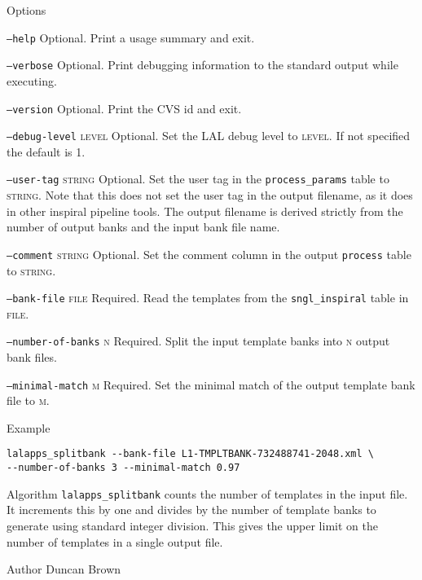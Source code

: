 \begin{entry}
\item[Options]\leavevmode
\begin{entry}
\item[\texttt{--help}] Optional. Print a usage summary and exit.

\item[\texttt{--verbose}] Optional. Print debugging information to the
standard output while executing.

\item[\texttt{--version}] Optional.  Print the CVS id and exit.

\item[\texttt{--debug-level} \textsc{level}] Optional. Set the LAL debug
level to \textsc{level}. If not specified the default is 1.

\item[\texttt{--user-tag} \textsc{string}] Optional. Set the user tag in
the \texttt{process\_params} table to \textsc{string}. Note that this does
not set the user tag in the output filename, as it does in other inspiral
pipeline tools. The output filename is derived strictly from the number of
output banks and the input bank file name.

\item[\texttt{--comment} \textsc{string}] Optional. Set the comment column in
the output \texttt{process} table to \textsc{string}.

\item[\texttt{--bank-file} \textsc{file}] Required. Read the templates from
the \texttt{sngl\_inspiral} table in \textsc{file}.

\item[\texttt{--number-of-banks} \textsc{n}] Required. Split the input
template banks into \textsc{n} output bank files.

\item[\texttt{--minimal-match} \textsc{m}] Required. Set the minimal match of
the output template bank file to \textsc{m}.
\end{entry}

\item[Example]
\begin{verbatim}
lalapps_splitbank --bank-file L1-TMPLTBANK-732488741-2048.xml \
--number-of-banks 3 --minimal-match 0.97
\end{verbatim}

\item[Algorithm]
\texttt{lalapps\_splitbank} counts the number of templates in the input file.
It increments this by one and divides by the number of template banks to
generate using standard integer division. This gives the upper limit on the
number of templates in a single output file.

\item[Author] 
Duncan Brown
\end{entry}


